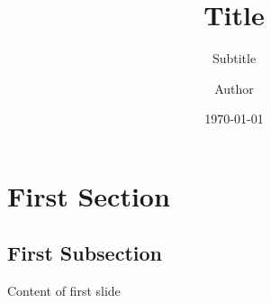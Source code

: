 \documentclass[
	aspectratio=169, %
	8pt %
]{beamer}
\title[Short Title]{Title} %
\subtitle[Short Subtitle]{Subtitle} %
\author[Short Author]{Author} %
\date{\today} %
\begin{document}

\section{First Section}

\subsection{First Subsection}
\begin{frame}{\insertsubsection}
    Content of first slide
\end{frame}
\end{document}
